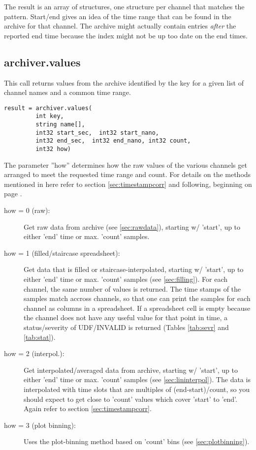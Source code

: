 \noindent The result is an array of structures,  one structure
per channel that matches the pattern.
Start/end gives an idea of the time range that can
be found in the archive for that channel.
The archive might actually contain entries \emph{after}
the reported end time because the index might not
be up too date on the end times.

\subsection{archiver.values} %
This call returns values from the archive identified by the key for a
given list of channel names and a common time range.

\begin{lstlisting}[keywordstyle=\sffamily]
result = archiver.values(
         int key, 
         string name[], 
         int32 start_sec,  int32 start_nano,
         int32 end_sec,  int32 end_nano, int32 count,
         int32 how)
\end{lstlisting}

\noindent The parameter ''how'' determines how the raw values of the
various channels get arranged to meet the requested time range and
count.  For details on the methods mentioned in here refer to section
\ref{sec:timestampcorr} and following, beginning on page
\pageref{sec:timestampcorr}.
\begin{description}
\item[\sffamily how = 0 (raw):]
  Get raw data from archive (see \ref{sec:rawdata}), starting w/ 'start',
  up to either 'end' time or max. 'count' samples.
\item[\sffamily how = 1 (filled/staircase spreadsheet):]
  Get data that is filled or staircase-interpolated, starting
  w/ 'start', up to either 'end' time or max. 'count' samples
  (see \ref{sec:filling}).
  For each channel, the same number of values is returned. The
  time stamps of the samples match accross channels, so that one can
  print the samples for each channel as columns in a spreadsheet.
  If a spreadsheet cell is empty because the channel does not have any
  useful value for that point in time, a status/severity of
  UDF/INVALID is returned (Tables \ref{tab:sevr} and \ref{tab:stat}).
\item[\sffamily how = 2 (interpol.):]
  Get interpolated/averaged data from archive, starting w/ 'start',
  up to either 'end' time or max. 'count' samples
  (see \ref{sec:lininterpol}).
  The data is interpolated with time slots that are multiples
  of (end-start)/count, so you should expect to get close to 'count'
  values which cover 'start' to 'end'.
  Again refer to section \ref{sec:timestampcorr}.
\item[\sffamily how = 3 (plot binning):]
  Uses the plot-binning method based on 'count' bins
  (see \ref{sec:plotbinning}).
\end{description}

